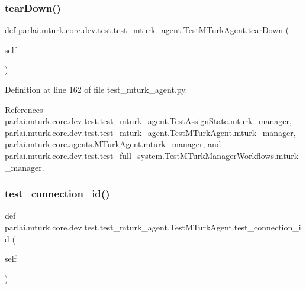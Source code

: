 \subsubsection{\texorpdfstring{tear\+Down()}{tearDown()}}
{\footnotesize\ttfamily def parlai.\+mturk.\+core.\+dev.\+test.\+test\+\_\+mturk\+\_\+agent.\+Test\+M\+Turk\+Agent.\+tear\+Down (\begin{DoxyParamCaption}\item[{}]{self }\end{DoxyParamCaption})}



Definition at line 162 of file test\+\_\+mturk\+\_\+agent.\+py.



References parlai.\+mturk.\+core.\+dev.\+test.\+test\+\_\+mturk\+\_\+agent.\+Test\+Assign\+State.\+mturk\+\_\+manager, parlai.\+mturk.\+core.\+dev.\+test.\+test\+\_\+mturk\+\_\+agent.\+Test\+M\+Turk\+Agent.\+mturk\+\_\+manager, parlai.\+mturk.\+core.\+agents.\+M\+Turk\+Agent.\+mturk\+\_\+manager, and parlai.\+mturk.\+core.\+dev.\+test.\+test\+\_\+full\+\_\+system.\+Test\+M\+Turk\+Manager\+Workflows.\+mturk\+\_\+manager.

\mbox{\label{classparlai_1_1mturk_1_1core_1_1dev_1_1test_1_1test__mturk__agent_1_1TestMTurkAgent_a978ff70bb9e6e752c06f5c6db8e63d52}} 
\subsubsection{\texorpdfstring{test\+\_\+connection\+\_\+id()}{test\_connection\_id()}}
{\footnotesize\ttfamily def parlai.\+mturk.\+core.\+dev.\+test.\+test\+\_\+mturk\+\_\+agent.\+Test\+M\+Turk\+Agent.\+test\+\_\+connection\+\_\+id (\begin{DoxyParamCaption}\item[{}]{self }\end{DoxyParamCaption})}

